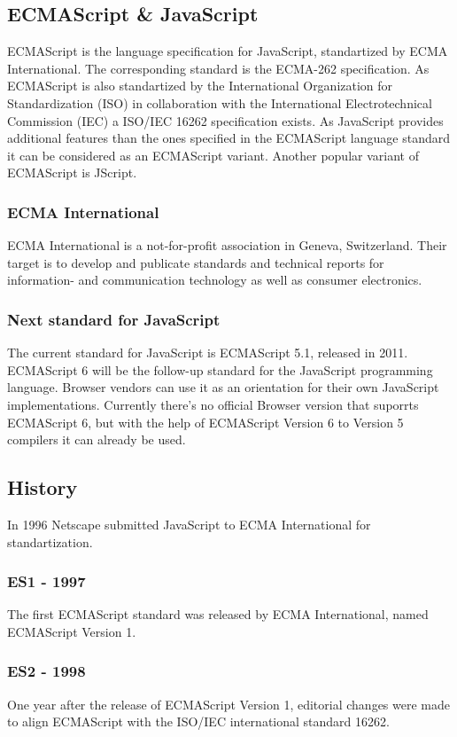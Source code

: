 \documentclass{bioinfo}
\begin{document}
\subsection{ECMAScript \& JavaScript}
ECMAScript is the language specification for JavaScript, standartized by ECMA International. The corresponding standard is the ECMA-262 specification. 
As ECMAScript is also standartized by the International Organization for Standardization (ISO) in collaboration with the International Electrotechnical Commission (IEC) a ISO/IEC 16262 specification exists.
As JavaScript provides additional features than the ones specified in the ECMAScript language standard it can be considered as an ECMAScript variant. Another popular variant of ECMAScript is JScript.
\subsubsection{ECMA International}
ECMA International is a not-for-profit association in Geneva, Switzerland. 
Their target is to develop and publicate standards and technical reports for information- and
communication technology as well as consumer electronics. 
\subsubsection{Next standard for JavaScript}
The current standard for JavaScript is ECMAScript 5.1, released in 2011. 
ECMAScript 6 will be the follow-up standard for the JavaScript programming language.
Browser vendors can use it as an orientation for their own JavaScript implementations.
Currently there's no official Browser version that suporrts ECMAScript 6, but with the 
help of ECMAScript Version 6 to Version 5 compilers it can already be used.

\subsection{History}
In 1996 Netscape submitted JavaScript to ECMA International for standartization.
\subsubsection*{\textbf{ES1 - 1997}}
The first ECMAScript standard was released by ECMA International, named ECMAScript Version 1.
\subsubsection*{\textbf{ES2 - 1998}}
One year after the release of ECMAScript Version 1, editorial changes were made to align ECMAScript with the ISO/IEC international standard 16262.
\end{document}

